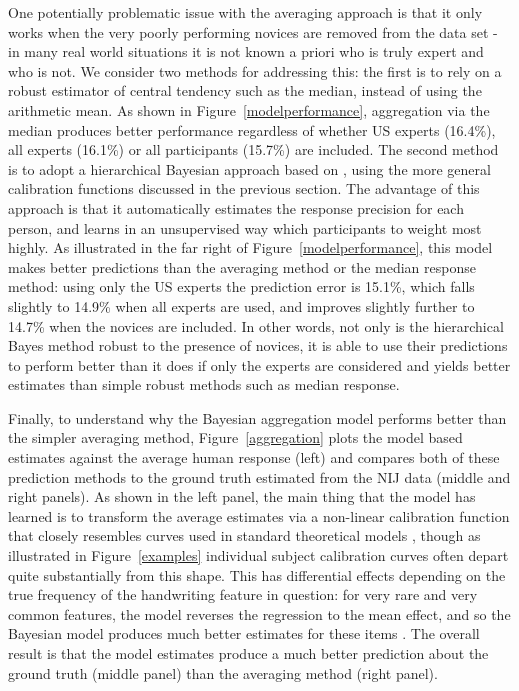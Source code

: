 \documentclass[doc]{apa6} %
\begin{document}
One potentially problematic issue with the averaging approach is that it only works when the very poorly performing novices are removed from the data set - in many real world situations it is not known a priori who is truly expert and who is not. We consider two methods for addressing this: the first is to rely on a robust estimator of central tendency such as the median, instead of using the arithmetic mean. As shown in Figure~\ref{modelperformance}, aggregation via the median produces better performance regardless of whether US experts (16.4\%), all experts (16.1\%) or all participants (15.7\%) are included. The second method is to adopt a hierarchical Bayesian approach based on , using the more general calibration functions discussed in the previous section. The advantage of this approach is that it automatically estimates the response precision for each person, and learns in an unsupervised way which participants to weight most highly. As illustrated in the far right of Figure~\ref{modelperformance}, this model makes better predictions than the averaging method or the median response method: using only the US experts the prediction error is 15.1\%, which falls slightly to 14.9\% when all experts are used, and improves slightly further to 14.7\% when the novices are included. In other words, not only is the hierarchical Bayes method robust to the presence of novices, it is able to use their predictions to perform better than it does if only the experts are considered and yields better estimates than simple robust methods such as median response.

Finally, to understand why the Bayesian aggregation model performs better than the simpler averaging method, Figure~\ref{aggregation} plots the model based estimates against the average human response (left) and compares both of these prediction methods to the ground truth estimated from the NIJ data (middle and right panels). As shown in the left panel, the main thing that the model has learned is to transform the average estimates via a non-linear calibration function that closely resembles curves used in standard theoretical models \cite{prelec1998probability}, though as illustrated in Figure~\ref{examples} individual subject calibration curves often depart quite substantially from this shape. This has differential effects depending on the true frequency of the handwriting feature in question: for very rare and very common features, the model reverses the regression to the mean effect, and so the Bayesian model produces much better estimates for these items \cite<see also>{satopaa2014combining}. The overall result is that the model estimates produce a much better prediction about the ground truth (middle panel) than the averaging method (right panel).
\end{document}
